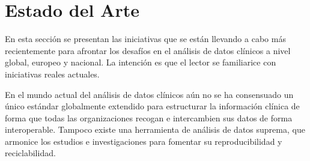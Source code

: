 \section{Estado del Arte} \label{sec:01EstadoArte} 

En esta sección se presentan las iniciativas que se están llevando a cabo más recientemente para afrontar los desafíos en el análisis de datos clínicos a nivel global, europeo y nacional. La intención es que el lector se familiarice con iniciativas reales actuales.





En el mundo actual del análisis de datos clínicos aún no se ha consensuado un único estándar globalmente extendido para estructurar la información clínica de forma que todas las organizaciones recogan e intercambien sus datos de forma interoperable. Tampoco existe una herramienta de análisis de datos suprema, que armonice los estudios e investigaciones para fomentar su reproducibilidad y reciclabilidad. 

